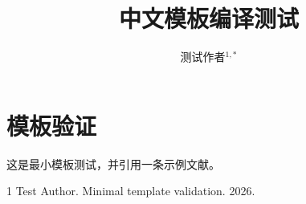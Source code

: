 \documentclass[review]{kxtbcas}
\title{中文模板编译测试}
\author{测试作者$^{1,*}$}
\affiliation{$^{1}$示例研究机构}
\begin{document}
\maketitle

\section{模板验证}
这是最小模板测试，并引用一条示例文献\cite{example2026}。

\begin{figure}[htbp]
  \centering
  \fbox{\rule{0pt}{20mm}\rule{35mm}{0pt}}
\end{figure}

\begin{thebibliography}{1}
Test Author. Minimal template validation. 2026.
\end{thebibliography}
\end{document}
